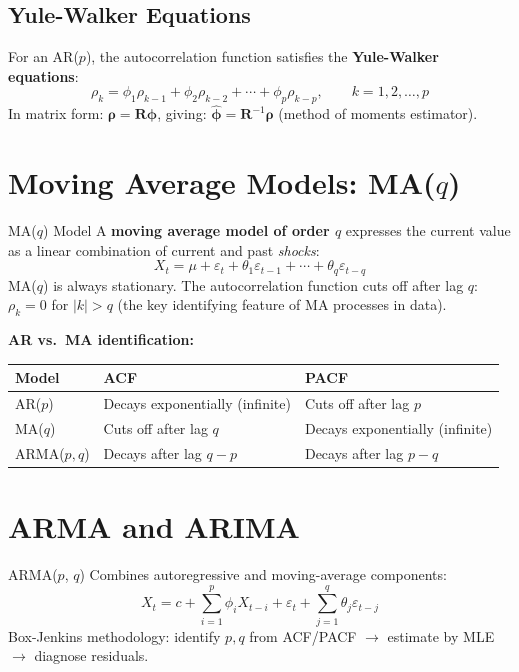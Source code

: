 \documentclass[12pt,a4paper,openany]{report}
\theoremstyle{definition}
\begin{document}
\subsection{Yule-Walker Equations}

For an AR($p$), the autocorrelation function satisfies the \textbf{Yule-Walker equations}:
\begin{equation}
  \rho_k = \phi_1 \rho_{k-1} + \phi_2 \rho_{k-2} + \cdots + \phi_p \rho_{k-p}, \qquad k = 1, 2, \ldots, p
\end{equation}
In matrix form: $\boldsymbol{\rho} = \mathbf{R}\boldsymbol{\phi}$, giving:
$\hat{\boldsymbol{\phi}} = \mathbf{R}^{-1}\boldsymbol{\rho}$ (method of moments estimator).

\section{Moving Average Models: MA(\texorpdfstring{$q$}{q})}

\begin{definitionbox}{MA($q$) Model}
A \textbf{moving average model of order $q$} expresses the current value as a linear combination of current and past \emph{shocks}:
\[
  X_t = \mu + \varepsilon_t + \theta_1\varepsilon_{t-1} + \cdots + \theta_q\varepsilon_{t-q}
\]
MA($q$) is always stationary. The autocorrelation function cuts off after lag $q$: $\rho_k = 0$ for $|k| > q$ (the key identifying feature of MA processes in data).
\end{definitionbox}

\textbf{AR vs.\ MA identification:}
\begin{center}
\begin{tabular}{lll}
\toprule
\textbf{Model} & \textbf{ACF} & \textbf{PACF} \\
\midrule
AR($p$) & Decays exponentially (infinite) & Cuts off after lag $p$ \\
MA($q$) & Cuts off after lag $q$ & Decays exponentially (infinite) \\
ARMA($p,q$) & Decays after lag $q-p$ & Decays after lag $p-q$ \\
\bottomrule
\end{tabular}
\end{center}

\section{ARMA and ARIMA}

\begin{definitionbox}{ARMA($p$, $q$)}
Combines autoregressive and moving-average components:
\[
  X_t = c + \sum_{i=1}^p \phi_i X_{t-i} + \varepsilon_t + \sum_{j=1}^q \theta_j \varepsilon_{t-j}
\]
Box-Jenkins methodology: identify $p,q$ from ACF/PACF $\to$ estimate by MLE $\to$ diagnose residuals.
\end{definitionbox}
\end{document}
